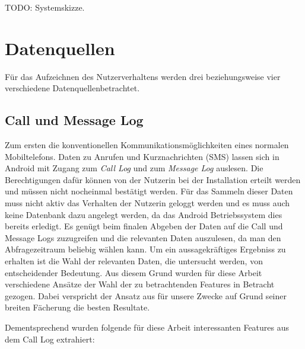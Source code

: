 \par

TODO: Systemskizze. 

\section{Datenquellen}

Für das Aufzeichnen des Nutzerverhaltens werden drei beziehungsweise vier verschiedene Datenquellenbetrachtet.
\par

\subsection{Call und Message Log}
Zum ersten die konventionellen Kommunikationsmöglichkeiten eines normalen Mobiltelefons.
Daten zu Anrufen und Kurznachrichten (SMS) lassen sich in Android mit Zugang zum \emph{Call Log} und zum \emph{Message Log} auslesen.
Die Berechtigungen dafür können von der Nutzerin bei der Installation erteilt werden und müssen nicht nocheinmal bestätigt werden.
Für das Sammeln dieser Daten muss nicht aktiv das Verhalten der Nutzerin geloggt werden und es muss auch keine Datenbank dazu angelegt werden,
da das Android Betriebssystem dies bereits erledigt.
Es genügt beim finalen Abgeben der Daten auf die Call und Message Logs zuzugreifen und die relevanten Daten auszulesen, da man den Abfragezeitraum beliebig wählen kann.
Um ein aussagekräftiges Ergebniss zu erhalten ist die Wahl der relevanten Daten, die untersucht werden, von entscheidender Bedeutung. 
Aus diesem Grund wurden für diese Arbeit verschiedene Ansätze der Wahl der zu betrachtenden Features in Betracht gezogen. 
Dabei verspricht der Ansatz aus \cite{chittaranjan2011s} für unsere Zwecke auf Grund seiner breiten Fächerung die besten Resultate.
\par

Dementsprechend wurden folgende für diese Arbeit interessanten Features aus dem Call Log extrahiert:

